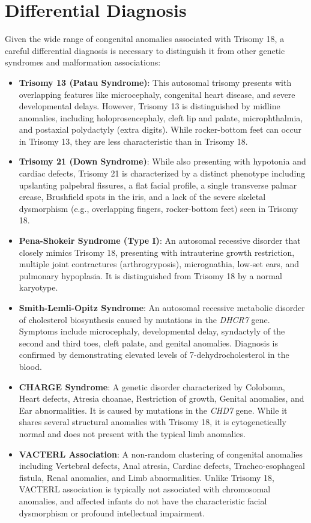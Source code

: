 \section*{Differential Diagnosis}
Given the wide range of congenital anomalies associated with Trisomy 18, a careful differential diagnosis is necessary to distinguish it from other genetic syndromes and malformation associations:
\begin{itemize}
    \item \textbf{Trisomy 13 (Patau Syndrome)}: This autosomal trisomy presents with overlapping features like microcephaly, congenital heart disease, and severe developmental delays. However, Trisomy 13 is distinguished by midline anomalies, including holoprosencephaly, cleft lip and palate, microphthalmia, and postaxial polydactyly (extra digits). While rocker-bottom feet can occur in Trisomy 13, they are less characteristic than in Trisomy 18.
    \item \textbf{Trisomy 21 (Down Syndrome)}: While also presenting with hypotonia and cardiac defects, Trisomy 21 is characterized by a distinct phenotype including upslanting palpebral fissures, a flat facial profile, a single transverse palmar crease, Brushfield spots in the iris, and a lack of the severe skeletal dysmorphism (e.g., overlapping fingers, rocker-bottom feet) seen in Trisomy 18.
    \item \textbf{Pena-Shokeir Syndrome (Type I)}: An autosomal recessive disorder that closely mimics Trisomy 18, presenting with intrauterine growth restriction, multiple joint contractures (arthrogryposis), micrognathia, low-set ears, and pulmonary hypoplasia. It is distinguished from Trisomy 18 by a normal karyotype.
    \item \textbf{Smith-Lemli-Opitz Syndrome}: An autosomal recessive metabolic disorder of cholesterol biosynthesis caused by mutations in the \textit{DHCR7} gene. Symptoms include microcephaly, developmental delay, syndactyly of the second and third toes, cleft palate, and genital anomalies. Diagnosis is confirmed by demonstrating elevated levels of 7-dehydrocholesterol in the blood.
    \item \textbf{CHARGE Syndrome}: A genetic disorder characterized by Coloboma, Heart defects, Atresia choanae, Restriction of growth, Genital anomalies, and Ear abnormalities. It is caused by mutations in the \textit{CHD7} gene. While it shares several structural anomalies with Trisomy 18, it is cytogenetically normal and does not present with the typical limb anomalies.
    \item \textbf{VACTERL Association}: A non-random clustering of congenital anomalies including Vertebral defects, Anal atresia, Cardiac defects, Tracheo-esophageal fistula, Renal anomalies, and Limb abnormalities. Unlike Trisomy 18, VACTERL association is typically not associated with chromosomal anomalies, and affected infants do not have the characteristic facial dysmorphism or profound intellectual impairment.
\end{itemize}

